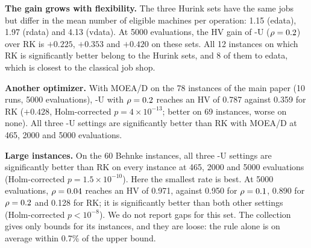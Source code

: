 \documentclass[journal]{IEEEtran}
\begin{document}
\textbf{The gain grows with flexibility.}
The three Hurink sets have the same jobs but differ in the mean number of eligible machines per operation: 1.15 (edata), 1.97 (rdata) and 4.13 (vdata).
At 5000 evaluations, the HV gain of \RDD-U ($\rho = 0.2$) over RK is $+0.225$, $+0.353$ and $+0.420$ on these sets.
All 12 instances on which RK is significantly better belong to the Hurink sets, and 8 of them to edata, which is closest to the classical job shop.


\textbf{Another optimizer.}
With MOEA/D on the 78 instances of the main paper (10 runs, 5000 evaluations), \RDD-U with $\rho = 0.2$ reaches an HV of 0.787 against 0.359 for RK
($+0.428$, Holm-corrected $p = 4 \times 10^{-13}$; better on 69 instances, worse on none).
All three \RDD-U settings are significantly better than RK with MOEA/D at 465, 2000 and 5000 evaluations.

\textbf{Large instances.}
On the 60 Behnke instances, all three \RDD-U settings are significantly better than RK on every instance at 465, 2000 and 5000 evaluations (Holm-corrected $p = 1.5 \times 10^{-10}$).
Here the smallest rate is best.
At 5000 evaluations, $\rho = 0.04$ reaches an HV of 0.971, against 0.950 for $\rho = 0.1$, 0.890 for $\rho = 0.2$ and 0.128 for RK;
it is significantly better than both other settings (Holm-corrected $p < 10^{-8}$).
We do not report gaps for this set.
The collection gives only bounds for its instances, and they are loose: the rule alone is on average within 0.7\% of the upper bound.
\end{document}
